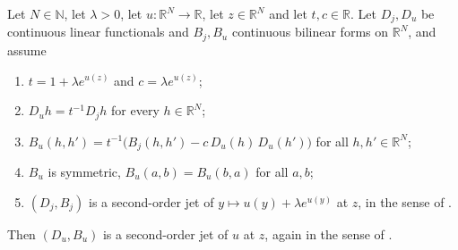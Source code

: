 \begin{lemma}
Let $N\in\mathbb N$, let $\lambda>0$, let $u:\mathbb R^{N}\to\mathbb R$, let
$z\in\mathbb R^{N}$ and let $t,c\in\mathbb R$. Let $D_j,D_u$ be continuous linear
functionals and $B_j,B_u$ continuous bilinear forms on $\mathbb R^{N}$, and assume
\begin{enumerate}
\item $t=1+\lambda e^{u(z)}$ and $c=\lambda e^{u(z)}$;
\item $D_u h=t^{-1}D_j h$ for every $h\in\mathbb R^{N}$;
\item $B_u(h,h')=t^{-1}\big(B_j(h,h')-c\,D_u(h)\,D_u(h')\big)$ for all
  $h,h'\in\mathbb R^{N}$;
\item $B_u$ is symmetric, $B_u(a,b)=B_u(b,a)$ for all $a,b$;
\item $(D_j,B_j)$ is a second-order jet of $y\mapsto u(y)+\lambda e^{u(y)}$ at $z$, in the
  sense of .
\end{enumerate}
Then $(D_u,B_u)$ is a second-order jet of $u$ at $z$, again in the sense of
.
\end{lemma}
